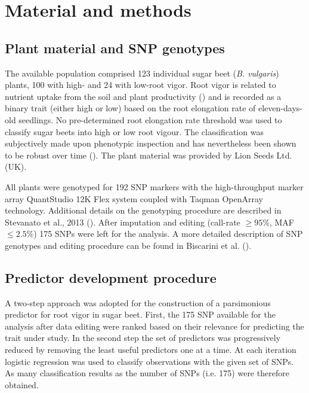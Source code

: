 \section{Material and methods}

\subsection{Plant material and SNP genotypes}
\label{sec:data}
The available population comprised 123 individual sugar beet (\emph{B. vulgaris})
plants, 100 with high- and 24 with low-root vigor. Root vigor is related
to nutrient uptake from the soil and plant productivity
(\cite{stevanato2010root}) and is recorded as a binary trait (either
high or low) based on the root elongation
rate of eleven-days-old seedlings. No pre-determined root
elongation rate threshold was used to classify sugar beets into high or low
root vigour. The classification was subjectively made upon phenotypic
inspection and has nevertheless been shown to be robust over time (\cite{stevanato2010root}). 
The plant material was provided by Lion Seeds Ltd. (UK).

All plants were genotyped for 192 SNP markers with the
high-throughput marker array QuantStudio 12K Flex system
coupled with Taqman OpenArray technology. Additional details on the
genotyping procedure are described in Stevanato et al., 2013 (\cite{stevanato2013high}).
After imputation and editing (call-rate $\geq 95\%$, MAF $\leq 2.5\%$)
175 SNPs were left for the analysis. A more detailed description of SNP
genotypes and editing procedure can be found in Biscarini et al. (\cite{biscarini2014genome}).

\subsection{Predictor development procedure}
\label{sec:overview}
A two-step approach was adopted for the construction of a parsimonious
predictor for root vigor in sugar beet.
First, the 175 SNP available for the analysis after data editing were ranked based on their
relevance for predicting the trait under study.
In the second step the set of predictors was progressively reduced by
removing the least useful predictors one at a time. At each iteration
logistic regression was used to classify observations with the given set
of SNPs. 
As many classification results as the number of SNPs (i.e. 175) were
therefore obtained.

